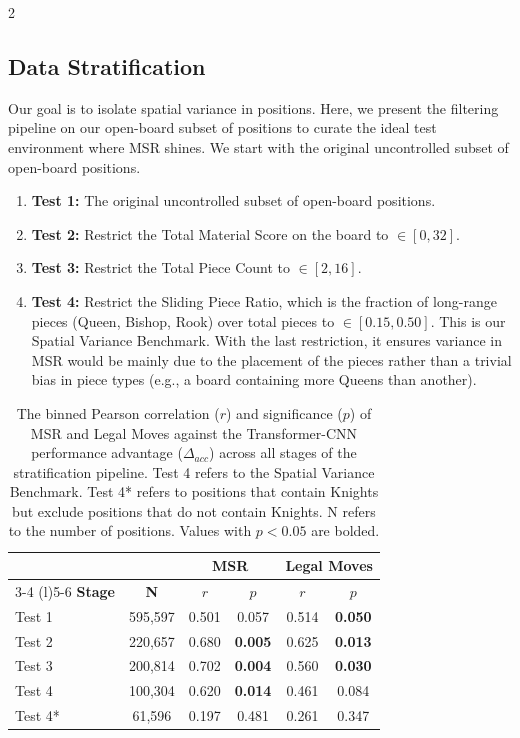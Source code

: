 \documentclass[a4paper,10pt]{article}
\begin{document}
\begin{multicols*}{2}
\subsection{Data Stratification}
Our goal is to isolate spatial variance in positions. Here, we present the filtering pipeline on our open-board subset of positions to curate the ideal test environment where MSR shines. We start with the original uncontrolled subset of open-board positions. 
\begin{enumerate}[leftmargin=*, noitemsep]
    \item \textbf{Test 1:} The original uncontrolled subset of open-board positions. 
    \item \textbf{Test 2:} Restrict the Total Material Score on the board to $\in [0, 32]$.
    \item \textbf{Test 3:} Restrict the Total Piece Count to $\in [2, 16]$.
    \item \textbf{Test 4:} Restrict the Sliding Piece Ratio, which is the fraction of long-range pieces (Queen, Bishop, Rook) over total pieces to $\in [0.15, 0.50]$. This is our Spatial Variance Benchmark. With the last restriction, it ensures variance in MSR would be mainly due to the placement of the pieces rather than a trivial bias in piece types (e.g., a board containing more Queens than another).
\end{enumerate}

\begin{table}[H]
\centering
\caption{The binned Pearson correlation ($r$) and significance ($p$) of MSR and Legal Moves against the Transformer-CNN performance advantage ($\Delta_{acc}$) across all stages of the stratification pipeline. Test 4 refers to the Spatial Variance Benchmark. Test 4* refers to positions that contain Knights but exclude positions that do not contain Knights. N refers to the number of positions. Values with $p < 0.05$ are bolded.}
\label{tab:open_board_ablation}
\begin{tabular}{@{}lccccc@{}}
\toprule
& & \multicolumn{2}{c}{\textbf{MSR}} & \multicolumn{2}{c}{\textbf{Legal Moves}} \\
\cmidrule(lr){3-4} \cmidrule(l){5-6} 
\textbf{Stage} & \textbf{N} & \textbf{$r$} & \textbf{$p$} & \textbf{$r$} & \textbf{$p$} \\ \midrule
Test 1 & 595,597 & 0.501 & 0.057 & 0.514 & \textbf{0.050} \\
Test 2 & 220,657 & 0.680 & \textbf{0.005} & 0.625 & \textbf{0.013} \\
Test 3 & 200,814 & 0.702 & \textbf{0.004} & 0.560 & \textbf{0.030} \\
Test 4 & 100,304 & 0.620 & \textbf{0.014} & 0.461 & 0.084 \\ \midrule
Test 4* & 61,596 & 0.197 & 0.481 & 0.261 & 0.347 \\ \bottomrule
\end{tabular}
\end{table}


\end{multicols*}
\end{document}
